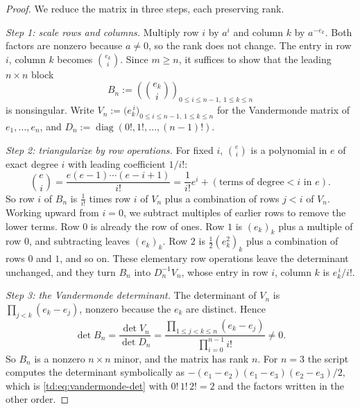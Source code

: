 \documentclass[a4paper,11pt]{article}
\newcommand{\filename}[1]{\texttt{\seqsplit{#1}}}
\theoremstyle{jsplain}
\theoremstyle{jsdef}
\theoremstyle{jsrem}
\begin{document}
\begin{proof}
We reduce the matrix in three steps, each preserving rank.

\emph{Step 1: scale rows and columns.} Multiply row $i$ by $a^{i}$ and column $k$ by $a^{-e_k}$.
Both factors are nonzero because $a \neq 0$, so the rank does not change. The entry in row $i$,
column $k$ becomes $\binom{e_k}{i}$. Since $m \geq n$, it suffices to show that the leading
$n \times n$ block
\[
B_n := \left(\binom{e_k}{i}\right)_{0 \leq i \leq n-1,\ 1 \leq k \leq n}
\]
is nonsingular. Write $V_n := \bigl(e_k^{\,i}\bigr)_{0 \leq i \leq n-1,\ 1 \leq k \leq n}$ for the
Vandermonde matrix of $e_1, \dots, e_n$, and $D_n := \operatorname{diag}(0!, 1!, \dots, (n-1)!)$.

\emph{Step 2: triangularize by row operations.} For fixed $i$, $\binom{e}{i}$ is a polynomial in
$e$ of exact degree $i$ with leading coefficient $1/i!$:
\[
\binom{e}{i} = \frac{e (e-1) \cdots (e - i + 1)}{i!}
= \frac{1}{i!} e^i + (\text{terms of degree} < i \text{ in } e).
\]
So row $i$ of $B_n$ is $\frac{1}{i!}$ times row $i$ of $V_n$ plus a combination of rows $j < i$ of
$V_n$. Working upward from $i = 0$, we subtract multiples of earlier rows to remove the lower terms.
Row $0$ is already the row of ones. Row $1$ is $(e_k)_k$ plus a multiple of row $0$, and subtracting
leaves $(e_k)_k$. Row $2$ is $\frac12 (e_k^2)_k$ plus a combination of rows $0$ and $1$, and so on.
These elementary row operations leave the determinant unchanged, and they turn $B_n$ into
$D_n^{-1} V_n$, whose entry in row $i$, column $k$ is $e_k^{\,i}/i!$.

\emph{Step 3: the Vandermonde determinant.} The determinant of $V_n$ is
$\prod_{j < k} (e_k - e_j)$, nonzero because the $e_k$ are distinct. Hence
\begin{equation}\label{td:eq:vandermonde-det}
\det B_n = \frac{\det V_n}{\det D_n}
= \frac{\prod_{1 \leq j < k \leq n}(e_k - e_j)}{\prod_{i=0}^{n-1} i!} \neq 0.
\end{equation}
So $B_n$ is a nonzero $n \times n$ minor, and the matrix has rank $n$. For $n = 3$ the script
\filename{m1\_block\_rank.py} computes the determinant symbolically as
$-(e_1-e_2)(e_1-e_3)(e_2-e_3)/2$, which is \eqref{td:eq:vandermonde-det} with
$0!\,1!\,2! = 2$ and the factors written in the other order.
\end{proof}
\end{document}
